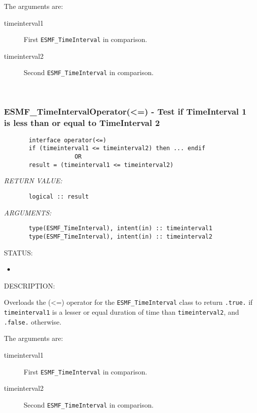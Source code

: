        The arguments are:
       \begin{description}
       \item[timeinterval1]
            First {\tt ESMF\_TimeInterval} in comparison.
       \item[timeinterval2]
            Second {\tt ESMF\_TimeInterval} in comparison.
       \end{description}
    
 
\mbox{}\hrulefill\ 
 
\subsubsection [ESMF\_TimeIntervalOperator(<=)] {ESMF\_TimeIntervalOperator(<=) - Test if TimeInterval 1 is less than or equal to TimeInterval 2}


  
\begin{verbatim}       interface operator(<=)
       if (timeinterval1 <= timeinterval2) then ... endif
                    OR
       result = (timeinterval1 <= timeinterval2)\end{verbatim}{\em RETURN VALUE:}
\begin{verbatim}       logical :: result\end{verbatim}{\em ARGUMENTS:}
\begin{verbatim}       type(ESMF_TimeInterval), intent(in) :: timeinterval1
       type(ESMF_TimeInterval), intent(in) :: timeinterval2\end{verbatim}
{\sf STATUS:}
   \begin{itemize}
   \item{}
   \end{itemize}
  
{\sf DESCRIPTION:\\ }


       Overloads the (<=) operator for the {\tt ESMF\_TimeInterval} class to
       return {\tt .true.} if {\tt timeinterval1} is a lesser or equal duration 
       of time than {\tt timeinterval2}, and {\tt .false.} otherwise.
  
       The arguments are:
       \begin{description}
       \item[timeinterval1]
            First {\tt ESMF\_TimeInterval} in comparison.
       \item[timeinterval2]
            Second {\tt ESMF\_TimeInterval} in comparison.
       \end{description}
    
